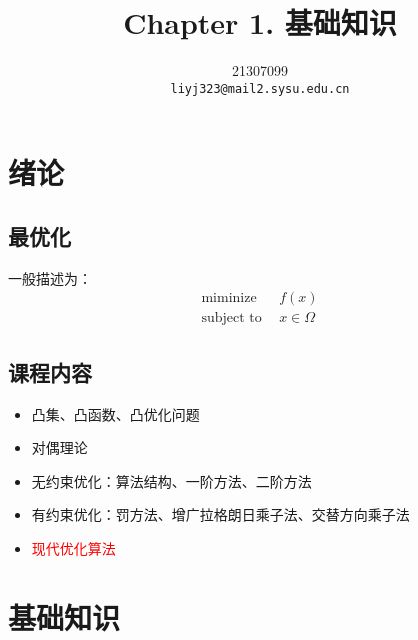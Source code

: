 \documentclass{mytemplate}
\title{Chapter 1. 基础知识}
\author{%
    21307099\\
    \texttt{liyj323@mail2.sysu.edu.cn} \\
}
\begin{document}
\maketitle

\tableofcontents
\section{绪论}
\subsection{最优化}
一般描述为：
\begin{align}
    \text{miminize}  \ \  & f(x)         \\
    \text{subject to}\ \  & x \in \Omega
\end{align}
\subsection{课程内容}
\begin{itemize}
    \item 凸集、凸函数、凸优化问题
    \item 对偶理论
    \item 无约束优化：算法结构、一阶方法、二阶方法
    \item 有约束优化：罚方法、增广拉格朗日乘子法、交替方向乘子法
    \item \textcolor{red}{现代优化算法}
\end{itemize}

\section{基础知识}
\end{document}
